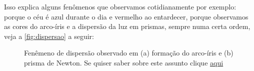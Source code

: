 Isso explica alguns fenômenos que observamos cotidianamente por exemplo: porque o céu é azul durante o dia e vermelho ao entardecer, porque observamos as cores do arco-íris e a dispersão da luz em prismas, sempre numa certa ordem, veja a \autoref{fig:dispersao} a seguir:
\vspace{5pt}
\begin{figure}[!ht]        
    \centering              
    \hspace{20pt}
    \caption{Fenêmeno de dispersão observado em (a) formação do arco-íris e (b) prisma de Newton. Se quiser saber sobre este assunto clique \href{https://www.bbc.com/portuguese/curiosidades-49906709}{aqui}}
    \label{fig:dispersao}
\end{figure}        
\vspace*{20pt}

